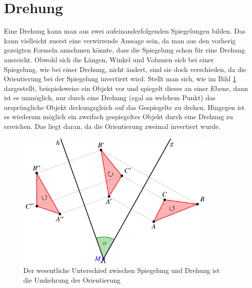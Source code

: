%
%
%
\section{Drehung}

Eine Drehung kann man aus zwei aufeinanderfolgenden Spiegelungen bilden. Das kann vielleicht zuerst eine verwirrende Aussage sein, da man aus den vorherig gezeigten Formeln annehmen könnte, dass die Spiegelung schon für eine Drehung ausreicht. Obwohl sich die Längen, Winkel und Volumen sich bei einer Spiegelung, wie bei einer Drehung, nicht ändert, sind sie doch verschieden, da die Orientierung bei der Spiegelung invertiert wird. Stellt man sich, wie im Bild \ref{BildSpiegRot} dargestellt, beispielsweise ein Objekt vor und spiegelt dieses an einer Ebene, dann ist es unmöglich, nur durch eine Drehung (egal an welchem Punkt) das ursprüngliche Objekt deckungsgleich auf das Gespiegelte zu drehen. Hingegen ist es wiederum möglich ein zweifach gespiegeltes Objekt durch eine Drehung zu erreichen. Das liegt daran, da die Orientierung zweimal invertiert wurde.

\begin{figure}
	\centering
	\includegraphics[width=10cm]{papers/clifford/images/spiegelung.pdf}
	\caption{Der wesentliche Unterschied zwischen Spiegelung und Drehung ist die Umkehrung der Orientierung}
	\label{BildSpiegRot}
\end{figure}

